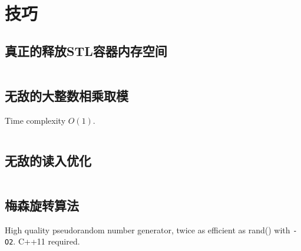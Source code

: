 \chapter{技巧}
\section{真正的释放STL容器内存空间}
\inputminted{cpp}{\source/tricks/truly-release-container-space.cpp}
\section{无敌的大整数相乘取模}
Time complexity $O(1)$.
\inputminted{cpp}{\source/tricks/O1-multiply-mod.cpp}
\section{无敌的读入优化}
\inputminted{cpp}{\source/tricks/unbeatable-input-acceleration.cpp}
\section{梅森旋转算法}
High quality pseudorandom number generator, twice as efficient as rand() with \texttt{-O2}.
C++11 required.
\inputminted{cpp}{\source/tricks/mersenne-twister.cpp}
